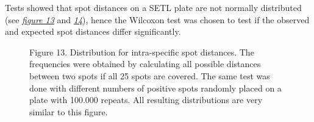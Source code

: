 \documentclass[letterpaper,10pt,english]{sphinxmanual}
\begin{document}
Tests showed that spot distances on a SETL plate are not normally
distributed (see {\hyperref[user_manual:fig-distance-distribution-intra]{\emph{figure 13}}}
and {\hyperref[user_manual:fig-distance-distribution-inter]{\emph{14}}}), hence the Wilcoxon
test was chosen to test if the observed and expected spot distances
differ significantly.
\begin{figure}[htbp]
\centering
\capstart

\caption{Figure 13. Distribution for intra-specific spot distances. The
frequencies were obtained by calculating all possible distances
between two spots if all 25 spots are covered.
The same test was done with different numbers of positive spots
randomly placed on a plate with 100.000 repeats. All
resulting distributions are very similar to this figure.}\label{user_manual:fig-distance-distribution-intra}\end{figure}
\end{document}
